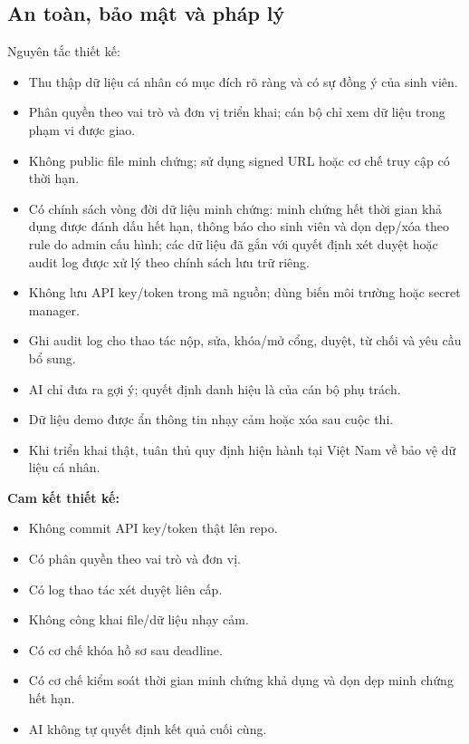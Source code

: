 \subsection{An toàn, bảo mật và pháp lý}

Nguyên tắc thiết kế:

\begin{itemize}
    \item Thu thập dữ liệu cá nhân có mục đích rõ ràng và có sự đồng ý của sinh viên.
    \item Phân quyền theo vai trò và đơn vị triển khai; cán bộ chỉ xem dữ liệu trong phạm vi được giao.
    \item Không public file minh chứng; sử dụng signed URL hoặc cơ chế truy cập có thời hạn.
    \item Có chính sách vòng đời dữ liệu minh chứng: minh chứng hết thời gian khả dụng được đánh dấu hết hạn, thông báo cho sinh viên và dọn dẹp/xóa theo rule do admin cấu hình; các dữ liệu đã gắn với quyết định xét duyệt hoặc audit log được xử lý theo chính sách lưu trữ riêng.
    \item Không lưu API key/token trong mã nguồn; dùng biến môi trường hoặc secret manager.
    \item Ghi audit log cho thao tác nộp, sửa, khóa/mở cổng, duyệt, từ chối và yêu cầu bổ sung.
    \item AI chỉ đưa ra gợi ý; quyết định danh hiệu là của cán bộ phụ trách.
    \item Dữ liệu demo được ẩn thông tin nhạy cảm hoặc xóa sau cuộc thi.
    \item Khi triển khai thật, tuân thủ quy định hiện hành tại Việt Nam về bảo vệ dữ liệu cá nhân.
\end{itemize}

\textbf{Cam kết thiết kế:}

\begin{itemize}
    \item  Không commit API key/token thật lên repo.
    \item  Có phân quyền theo vai trò và đơn vị.
    \item  Có log thao tác xét duyệt liên cấp.
    \item  Không công khai file/dữ liệu nhạy cảm.
    \item  Có cơ chế khóa hồ sơ sau deadline.
    \item  Có cơ chế kiểm soát thời gian minh chứng khả dụng và dọn dẹp minh chứng hết hạn.
    \item  AI không tự quyết định kết quả cuối cùng.
\end{itemize}

